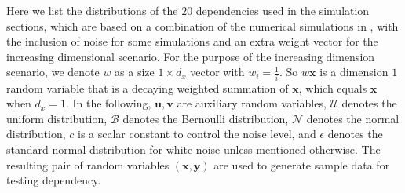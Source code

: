 \documentclass[11pt]{article}
\providecommand{\mb}[1]{\boldsymbol{#1}}
\providecommand{\mc}[1]{\mathcal{#1}}
\begin{document}
Here we list the distributions of the $20$ dependencies used in the simulation sections, which are based on a combination of the numerical simulations in \cite{SzekelyRizzoBakirov2007, SimonTibshirani2012, SimonTibshirani2012, GorfineHellerHeller2012}, with the inclusion of noise for some simulations and an extra weight vector for the increasing dimensional scenario.
For the purpose of the increasing dimension scenario, we denote $w$ as a size $1 \times d_{x}$ vector with $w_{i}=\frac{1}{i}$. So $w\mb{x}$ is a dimension $1$ random variable that is a decaying weighted summation of $\mb{x}$, which equals $\mb{x}$ when $d_{x}=1$. In the following, $\mb{u}, \mb{v}$ are auxiliary random variables, $\mc{U}$ denotes the uniform distribution, $\mc{B}$ denotes the Bernoulli distribution, $\mc{N}$ denotes the normal distribution, $c$ is a scalar constant to control the noise level, and $\epsilon$ denotes the standard normal distribution for white noise unless mentioned otherwise. The resulting pair of random variables $(\mb{x},\mb{y})$ are used to generate sample data for testing dependency.
\end{document}
